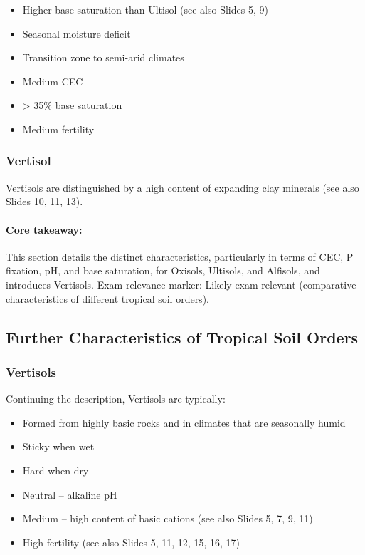 \begin{itemize} 
    \item Higher base saturation than Ultisol (see also Slides 5, 9) 
    \item Seasonal moisture deficit 
    \item Transition zone to semi-arid climates 
    \item Medium CEC 
    \item > 35\% base saturation 
    \item Medium fertility 
\end{itemize}

\subsubsection{Vertisol} Vertisols are distinguished by a high content of expanding clay minerals (see also Slides 10, 11, 13).

\paragraph*{Core takeaway:} 
This section details the distinct characteristics, particularly in terms of CEC, P fixation, pH, and base saturation, for Oxisols, Ultisols, and Alfisols, and introduces Vertisols. Exam relevance marker: Likely exam-relevant (comparative characteristics of different tropical soil orders).

\subsection{Further Characteristics of Tropical Soil Orders} \subsubsection{Vertisols} Continuing the description, Vertisols are typically: 

\begin{itemize} 
    \item Formed from highly basic rocks and in climates that are seasonally humid 
    \item Sticky when wet 
    \item Hard when dry 
    \item Neutral – alkaline pH 
    \item Medium – high content of basic cations (see also Slides 5, 7, 9, 11) 
    \item High fertility (see also Slides 5, 11, 12, 15, 16, 17) 
\end{itemize}

